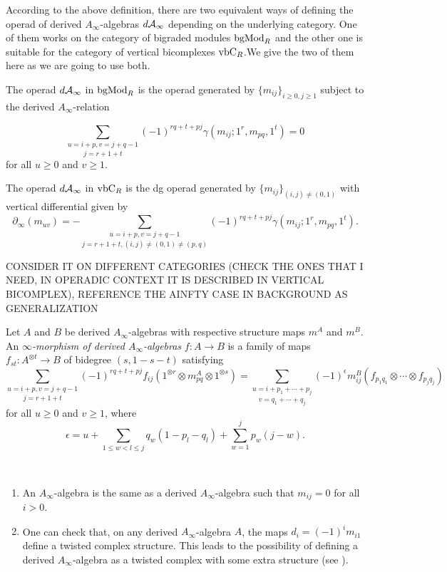 \documentclass[Thesis.tex]{subfiles}
\begin{document}
According to the above definition, there are two equivalent ways of defining the operad of derived $A_\infty$-algebras $d\mathcal{A}_\infty$ depending on the underlying category. One of them works on the category of bigraded modules $\mathrm{bgMod}_R$ and the other one is suitable for the category of vertical bicomplexes $\mathrm{vbC}_R$.We give the two of them here as we are going to use both.

\begin{defin}
The operad $d\mathcal{A}_\infty$ in $\mathrm{bgMod}_R$ is the operad generated by $\{m_{ij}\}_{i\geq 0,j\geq 1}$ subject to the derived $A_\infty$-relation

\[\underset{j=r+1+t}{\sum_{u=i+p, v=j+q-1}}(-1)^{rq+t+pj}\gamma(m_{ij};1^{ r}, m_{pq}, 1^{t})=0\]
for all $u\geq 0$ and $v\geq 1$. 

The operad $d\mathcal{A}_\infty$ in $\mathrm{vbC}_R$ is the dg operad generated by $\{m_{ij}\}_{(i,j)\neq (0,1)}$ with vertical differential given by
\[\partial_\infty(m_{uv})=-\underset{j=r+1+t, (i,j)\neq (0,1)\neq (p,q)}{\sum_{u=i+p, v=j+q-1}}(-1)^{rq+t+pj}\gamma(m_{ij};1^{ r}, m_{pq}, 1^{t}).\] %
\end{defin}

CONSIDER IT ON DIFFERENT CATEGORIES (CHECK THE ONES THAT I NEED, IN OPERADIC CONTEXT IT IS DESCRIBED IN VERTICAL BICOMPLEX), REFERENCE THE AINFTY CASE IN BACKGROUND AS GENERALIZATION


\begin{defin}
Let $A$ and $B$ be derived $A_\infty$-algebras with respective structure maps $m^A$ and $m^B$. An \emph{$\infty$-morphism of derived $A_\infty$-algebras} $f:A\to B$ is a family of maps $f_{st}:A^{\otimes t}\to B$ of bidegree $(s,1-s-t)$ satisfying
\begin{equation}\label{dinftymaps}
\underset{j=r+1+t}{\sum_{u=i+p, v=j+q-1}}(-1)^{rq+t+pj}f_{ij}(1^{\otimes r}\otimes m_{pq}^A\otimes 1^{\otimes s})=\underset{v=q_1+\cdots +q_j}{\sum_{u=i+p_1+\cdots +p_j}}(-1)^{\epsilon} m^B_{ij}(f_{p_1 q_1}\otimes\cdots\otimes f_{p_j q_j})
\end{equation}
for all $u\geq 0$ and $v\geq 1$, where
\[\epsilon = u + \sum_{1\leq w < l \leq j} q_w(1-p_l-q_l)  + \sum_{w=1}^j p_w(j-w).\]
\end{defin}
\begin{ex}\
\begin{enumerate}
\item An $A_\infty$-algebra is the same as a derived $A_\infty$-algebra such that $m_{ij}=0$ for all $i>0$.
\item One can check that, on any derived $A_\infty$-algebra $A$, the maps $d_i=(-1)^{i}m_{i1}$ define a twisted complex structure. This leads to the possibility of defining a derived $A_\infty$-algebra as a twisted complex with some extra structure (see ).

\end{enumerate}
\end{ex}
\end{document}
